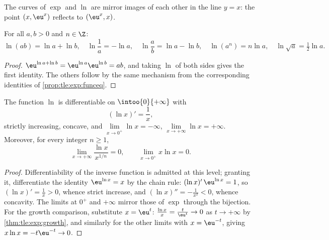 \begin{omfigure}

{\small The curves of $\exp$ and $\ln$ are mirror images of each other
in the line $y = x$: the point $(x, \eu^x)$ reflects to $(\eu^x, x)$.}
\end{omfigure}

\begin{proposition}\label{prop:tle:exp:lnalg}
For all $a, b > 0$ and $n \in \Z$:
\[
\ln(ab) = \ln a + \ln b, \quad
\ln\frac{1}{a} = -\ln a, \quad
\ln\frac{a}{b} = \ln a - \ln b, \quad
\ln(a^n) = n \ln a, \quad
\ln\sqrt{a} = \tfrac12 \ln a .
\]
\end{proposition}

\begin{proof}
$\eu^{\ln a + \ln b} = \eu^{\ln a}\eu^{\ln b} = ab$, and taking $\ln$ of both
sides gives the first identity. The others follow by the same mechanism from
the corresponding identities of \cref{prop:tle:exp:funceq}.
\end{proof}

\begin{proposition}\label{prop:tle:exp:lnanalytic}
The function $\ln$ is differentiable on $\intoo{0}{+\infty}$ with
\[
(\ln x)' = \frac{1}{x},
\]
strictly increasing, concave, and
$\lim\limits_{x\to0^+} \ln x = -\infty$,
$\lim\limits_{x\to+\infty} \ln x = +\infty$. Moreover, for every integer
$n \geq 1$,
\[
\lim_{x\to+\infty} \frac{\ln x}{x^{1/n}} = 0, \qquad
\lim_{x\to0^+} x \ln x = 0 .
\]
\end{proposition}

\begin{proof}
Differentiability of the inverse function is admitted at this level; granting
it, differentiate the identity $\eu^{\ln x} = x$ by the chain rule:
$(\ln x)'\,\eu^{\ln x} = 1$, so $(\ln x)' = \frac{1}{x} > 0$, whence strict
increase, and $(\ln x)'' = -\frac1{x^2} < 0$, whence concavity. The limits at
$0^+$ and $+\infty$ mirror those of $\exp$ through the bijection. For the
growth comparison, substitute $x = \eu^{t}$:
$\frac{\ln x}{x} = \frac{t}{\eu^t} \to 0$ as $t \to +\infty$ by
\cref{thm:tle:exp:growth}, and similarly for the other limits with
$x = \eu^{-t}$, giving $x\ln x = -t\eu^{-t} \to 0$.
\end{proof}

